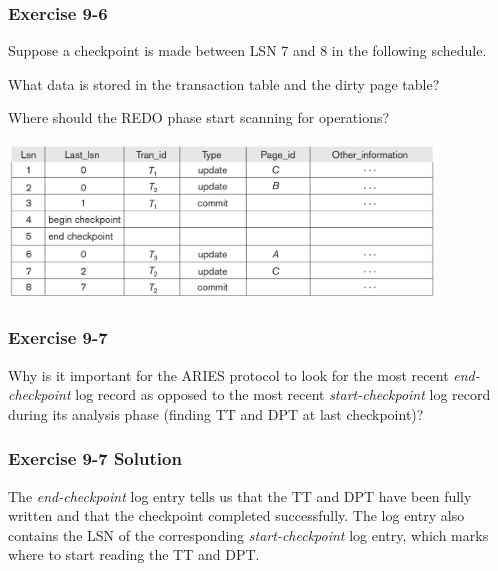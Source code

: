 \begin{frame}
\frametitle{Exercise 9-6}
  Suppose a checkpoint is made between LSN 7 and 8 in the following schedule.

  What data is stored in the transaction table and the dirty page table?

  Where should the REDO phase start scanning for operations?

  \begin{center}
  \includegraphics[width=0.85\textwidth]{images/aries-1}\\
  \end{center}
\end{frame}


\begin{frame}
\frametitle{Exercise 9-7}
  Why is it important for the ARIES protocol to look for the most recent \textit{end-checkpoint} log record as opposed to the most recent \textit{start-checkpoint} log record during its analysis phase (finding TT and DPT at last checkpoint)?
\end{frame}


\begin{frame}
\frametitle{Exercise 9-7 Solution}
  The \textit{end-checkpoint} log entry tells us that the TT and DPT have been fully written and that the checkpoint completed successfully. The log entry also contains the LSN of the corresponding \textit{start-checkpoint} log entry, which marks where to start reading the TT and DPT.
\end{frame}



